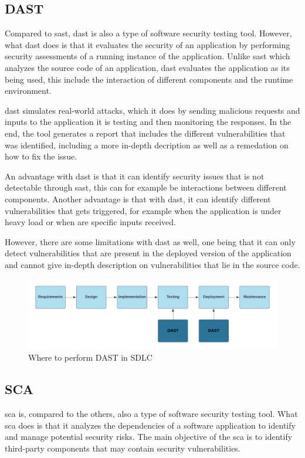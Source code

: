 \newpage
\subsection{DAST}
Compared to \acrshort{sast}, \acrlong{dast} is also a type of software security testing tool. However, what \acrshort{dast} does is that it evaluates the security of an application by performing security assessments of a running instance of the application. Unlike \acrshort{sast} which analyzes the source code of an application, \acrshort{dast} evaluates the application as its being used, this include the interaction of different components and the runtime environment. 

\acrshort{dast} simulates real-world attacks, which it does by sending malicious requests and inputs to the application it is testing and then monitoring the responses. In the end, the tool generates a report that includes the different vulnerabilities that was identified, including a more in-depth decription as well as a remedation on how to fix the issue. \cite{dast}

An advantage with \acrshort{dast} is that it can identify security issues that is not detectable through \acrshort{sast}, this can for example be interactions between different components. Another advantage is that with \acrshort{dast}, it can identify different vulnerabilities that gets triggered, for example when the application is under heavy load or when are specific inputs received.

However, there are some limitations with \acrshort{dast} as well, one being that it can only detect vulnerabilities that are present in the deployed version of the application and cannot give in-depth description on vulnerabilities that lie in the source code.

\begin{figure}[htp]
    \centering
    \includegraphics[width=1\columnwidth]{Images/DAST.png}
    \caption{Where to perform DAST in SDLC} 
    \label{fig:my_label}
\end{figure}

\newpage

\subsection{SCA}
\acrlong{sca} is, compared to the others, also a type of software security testing tool. What \acrshort{sca} does is that it analyzes the dependencies of a software application to identify and manage potential security risks. The main objective of the \acrshort{sca} is to identify third-party components that may contain security vulnerabilities. \cite{sca}

